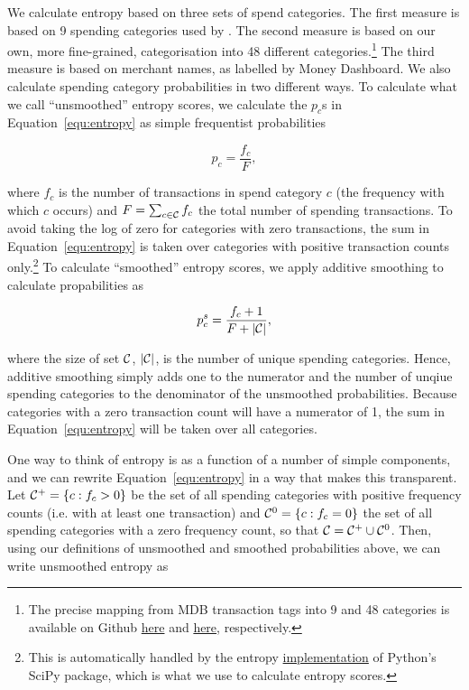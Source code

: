We calculate entropy based on three sets of spend categories. The first measure
is based on 9 spending categories used by \citet{muggleton2020evidence}. The
second measure is based on our own, more fine-grained, categorisation into 48
different categories.\footnote{The precise mapping from MDB transaction tags
    into 9 and 48 categories is available on Github
    \href{https://github.com/fabiangunzinger/entropy/blob/7fa9c565bf8959ea92a9d4fe2245da0864e19c27/src/data/txn_classifications.py\#L249}{here}
    and
    \href{https://github.com/fabiangunzinger/entropy/blob/7fa9c565bf8959ea92a9d4fe2245da0864e19c27/src/data/txn_classifications.py\#L503}{here},
respectively.} The third measure is based on merchant names, as labelled by
Money Dashboard. We also calculate spending category probabilities in two
different ways. To calculate what we call ``unsmoothed'' entropy scores, we
calculate the $p_c$s in Equation~\ref{equ:entropy} as simple frequentist
probabilities

\begin{equation}
    p_c = \frac{f_c}{F},
\end{equation}

\noindent where $f_c$ is the number of transactions in spend category $c$ (the
frequency with which $c$ occurs) and $F = \sum_{c \in \mathcal{C}}f_c$ the total
number of spending transactions. To avoid taking the log of zero for categories
with zero transactions, the sum in Equation~\ref{equ:entropy} is taken over
categories with positive transaction counts only.\footnote{This is
    automatically handled by the entropy
    \href{https://docs.scipy.org/doc/scipy/reference/generated/scipy.stats.entropy.html}{implementation}
of Python's SciPy package, which is what we use to calculate entropy scores.}
To calculate ``smoothed'' entropy scores, we apply additive smoothing to
calculate propabilities as

\begin{equation}
    \label{equ:prob_s}
    p_c^{s} = \frac{f_c + 1}{F + |\mathcal{C}|},
\end{equation}

\noindent where the size of set $\mathcal{C}$, $|\mathcal{C}|$, is the number of unique
spending categories. Hence, additive smoothing simply adds one to the numerator
and the number of unqiue spending categories to the denominator of the
unsmoothed probabilities. Because categories with a zero transaction count will
have a numerator of 1, the sum in Equation~\ref{equ:entropy} will be taken over
all categories.

One way to think of entropy is as a function of a number of simple components,
and we can rewrite Equation~\ref{equ:entropy} in a way that makes this
transparent. Let $\mathcal{C}^{+} = \{c: f_c > 0\}$ be the set of all spending
categories with positive frequency counts (i.e.  with at least one transaction)
and $\mathcal{C}^{0} = \{c: f_c = 0\}$ the set of all spending categories with a zero
frequency count, so that $\mathcal{C} = \mathcal{C}^{+} \cup \mathcal{C}^{0}$. Then, using our
definitions of unsmoothed and smoothed probabilities above, we can write
unsmoothed entropy as

